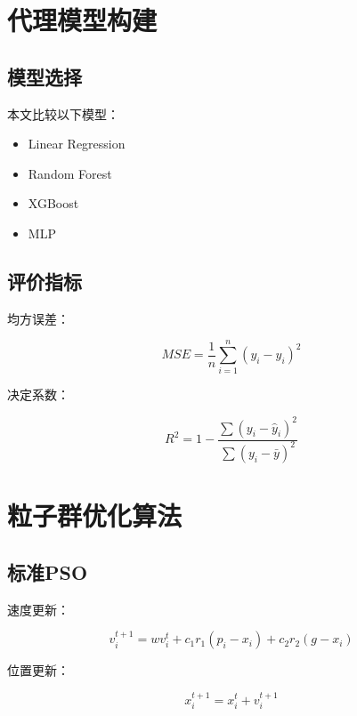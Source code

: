 \documentclass[UTF8,12pt,a4paper]{ctexart}
\begin{document}

\section{代理模型构建}

\subsection{模型选择}

本文比较以下模型：

\begin{itemize}
    \item Linear Regression
    \item Random Forest
    \item XGBoost
    \item MLP
\end{itemize}

\subsection{评价指标}

均方误差：

\begin{equation}
MSE=
\frac{1}{n}
\sum_{i=1}^{n}
(y_i-\hat y_i)^2
\end{equation}

决定系数：

\begin{equation}
R^2=
1-
\frac{\sum(y_i-\hat y_i)^2}
{\sum(y_i-\bar y)^2}
\end{equation}


\section{粒子群优化算法}

\subsection{标准PSO}

速度更新：

\begin{equation}
v_i^{t+1}
=
wv_i^t
+
c_1r_1(p_i-x_i)
+
c_2r_2(g-x_i)
\end{equation}

位置更新：

\begin{equation}
x_i^{t+1}
=
x_i^t
+
v_i^{t+1}
\end{equation}
\end{document}
